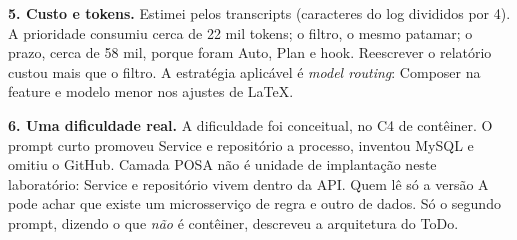 \documentclass[12pt,a4paper]{article}
\begin{document}
\textbf{5. Custo e tokens.} Estimei pelos transcripts (caracteres do log divididos por 4). A prioridade consumiu cerca de 22 mil tokens; o filtro, o mesmo patamar; o prazo, cerca de 58 mil, porque foram Auto, Plan e hook. Reescrever o relatório custou mais que o filtro. A estratégia aplicável é \emph{model routing}: Composer na feature e modelo menor nos ajustes de LaTeX.

\textbf{6. Uma dificuldade real.} A dificuldade foi conceitual, no C4 de contêiner. O prompt curto promoveu Service e repositório a processo, inventou MySQL e omitiu o GitHub. Camada POSA não é unidade de implantação neste laboratório: Service e repositório vivem dentro da API. Quem lê só a versão A pode achar que existe um microsserviço de regra e outro de dados. Só o segundo prompt, dizendo o que \emph{não} é contêiner, descreveu a arquitetura do ToDo.
\end{document}
